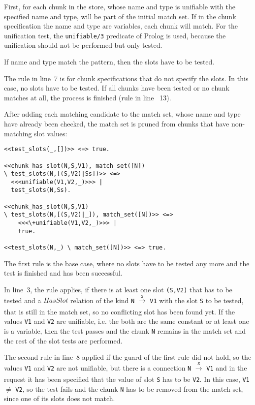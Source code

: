 First, for each chunk in the store, whose name and type is unifiable with the specified name and type, will be part of the initial match set. If in the chunk specification the name and type are variables, each chunk will match. For the unification test, the \lstinline|unifiable/3| predicate of Prolog is used, because the unification should not be performed but only tested. 

If name and type match the pattern, then the slots have to be tested.

The rule in line~7 is for chunk specifications that do not specify the slots. In this case, no slots have to be tested. If all chunks have been tested or no chunk matches at all, the process is finished (rule in line ~13).

After adding each matching candidate to the match set, whose name and type have already been checked, the match set is pruned from chunks that have non-matching slot values:

\begin{lstlisting}
<<test_slots(_,[])>> <=> true.

<<chunk_has_slot(N,S,V1), match_set([N]) 
\ test_slots(N,[(S,V2)|Ss])>> <=> 
  <<<unifiable(V1,V2,_)>>> | 
  test_slots(N,Ss).

<<chunk_has_slot(N,S,V1) 
\ test_slots(N,[(S,V2)|_]), match_set([N])>> <=> 
    <<<\+unifiable(V1,V2,_)>>> | 
    true.

<<test_slots(N,_) \ match_set([N])>> <=> true.
\end{lstlisting}

The first rule is the base case, where no slots have to be tested any more and the test is finished and has been successful.

In line~3, the rule applies, if there is at least one slot \lstinline|(S,V2)| that has to be tested and a $HasSlot$ relation of the kind \lstinline|N| $\xrightarrow[]{\mathtt{S}}$ \lstinline|V1| with the slot \lstinline|S| to be tested, that is still in the match set, so no conflicting slot has been found yet. If the values \lstinline|V1| and \lstinline|V2| are unifiable, i.e. the both are the same constant or at least one is a variable, then the test passes and the chunk \lstinline|N| remains in the match set and the rest of the slot tests are performed.

The second rule in line~8 applied if the guard of the first rule did not hold, so the values \lstinline|V1| and \lstinline|V2| are not unifiable, but there is a connection \lstinline|N| $\xrightarrow[]{\mathtt{S}}$ \lstinline|V1| and in the request it has been specified that the value of slot \lstinline|S| has to be \lstinline|V2|. In this case, \lstinline|V1| $\neq$ \lstinline|V2|, so the test fails and the chunk \lstinline|N| has to be removed from the match set, since one of its slots does not match.

